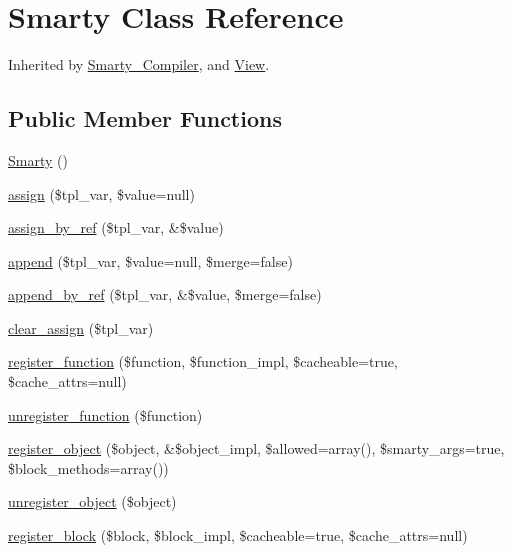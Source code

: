 \hypertarget{class_smarty}{}\section{Smarty Class Reference}
\label{class_smarty}


Inherited by \mbox{\hyperlink{class_smarty___compiler}{Smarty\+\_\+\+Compiler}}, and \mbox{\hyperlink{class_view}{View}}.

\subsection*{Public Member Functions}
\begin{DoxyCompactItemize}
\item 
\mbox{\hyperlink{class_smarty_a95e66b59b996781de0a0b95c83f1a5a7}{Smarty}} ()
\item 
\mbox{\hyperlink{class_smarty_a12150893d5c5bab121e248f450e727fa}{assign}} (\$tpl\+\_\+var, \$value=null)
\item 
\mbox{\hyperlink{class_smarty_aebc96e36370712d0c9e5896db76bd487}{assign\+\_\+by\+\_\+ref}} (\$tpl\+\_\+var, \&\$value)
\item 
\mbox{\hyperlink{class_smarty_a9870a97b08f66d2c1b19f3e54770cb29}{append}} (\$tpl\+\_\+var, \$value=null, \$merge=false)
\item 
\mbox{\hyperlink{class_smarty_a1a744cb1e3d6473ddcd531412c54f07e}{append\+\_\+by\+\_\+ref}} (\$tpl\+\_\+var, \&\$value, \$merge=false)
\item 
\mbox{\hyperlink{class_smarty_ad0188dcb261ac235ac70c141f2e6657e}{clear\+\_\+assign}} (\$tpl\+\_\+var)
\item 
\mbox{\hyperlink{class_smarty_aa933e1e9fb0b13f22101de4acbaf699c}{register\+\_\+function}} (\$function, \$function\+\_\+impl, \$cacheable=true, \$cache\+\_\+attrs=null)
\item 
\mbox{\hyperlink{class_smarty_ae73d72302d6bcf8a0b284654b2ecef15}{unregister\+\_\+function}} (\$function)
\item 
\mbox{\hyperlink{class_smarty_ad3e5b167a6483dbd669a736ee0000b9a}{register\+\_\+object}} (\$object, \&\$object\+\_\+impl, \$allowed=array(), \$smarty\+\_\+args=true, \$block\+\_\+methods=array())
\item 
\mbox{\hyperlink{class_smarty_a49288d1943e174bcb8e924a4b449d050}{unregister\+\_\+object}} (\$object)
\item 
\mbox{\hyperlink{class_smarty_a2a6564c20eaeecdddd192885f9d5a794}{register\+\_\+block}} (\$block, \$block\+\_\+impl, \$cacheable=true, \$cache\+\_\+attrs=null)

\end{DoxyCompactItemize}

